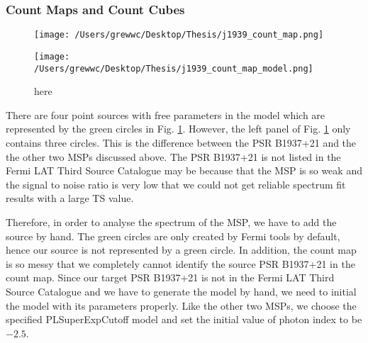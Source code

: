 \documentclass[12pt]{report}
\newcommand{\mycaption}[1]{\protect \caption{#1}}
\begin{document}
          \subsubsection{Count Maps and Count Cubes}
          \begin{figure}[!ht]
            \begin{center}
            \begin{minipage}{0.45\textwidth}
              \begin{center} 
                \texttt{[image: /Users/grewwc/Desktop/Thesis/j1939\_count\_map.png]}
              \end{center}
            \end{minipage}
            \begin{minipage}{0.45\textwidth}
              \begin{center}
                \texttt{[image: /Users/grewwc/Desktop/Thesis/j1939\_count\_map\_model.png]}
              \end{center}
            \end{minipage}
          \end{center}
          \caption{here}
          
            \label{fig: j1939_count_map}
          \end{figure}
          \vspace{1cm}

          There are four point sources with free parameters in the model which are represented by the green 
          circles in Fig. \ref{fig: j1939_count_map}.
          However, the left panel of Fig. \ref{fig: j1939_count_map} only contains three circles.
          This is the difference between the PSR B1937+21 and the the other two MSPs discussed 
          above. The PSR B1937+21 is not listed in the Fermi LAT Third Source Catalogue may be because that 
          the MSP is so weak and the signal to noise ratio is very low 
          that we could not get reliable spectrum fit results with a large TS value. 

          Therefore, in order to analyse the spectrum of the MSP, we have to add the source 
          by hand. The green circles are only created by Fermi tools by default, hence our source is 
          not represented by a green circle. In addition, the count map is so messy that we completely 
          cannot identify the source PSR B1937+21 in the count map. 
          Since our target PSR B1937+21 is not in the Fermi LAT Third Source Catalogue and 
          we have to generate the model by hand, we need to initial the model with its parameters properly.
          Like the other two MSPs, we choose the specified PLSuperExpCutoff model and set the initial value 
          of photon index to be $-2.5$.
\end{document}
